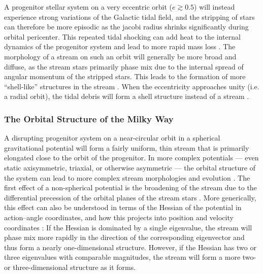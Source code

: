 \documentclass[final,5p,times,twocolumn,authoryear]{elsarticle}
\begin{document}
A progenitor stellar system on a very eccentric orbit ($e \gtrsim 0.5$) will instead
experience strong variations of the Galactic tidal field, and the stripping of stars can
therefore be more episodic as the jacobi radius shrinks significantly during orbital
pericenter.
This repeated tidal shocking can add heat to the internal dynamics of the progenitor
system and lead to more rapid mass loss \citep[e.g.,][]{gnedin:1999}.
The morphology of a stream on such an orbit will generally be more broad and diffuse, as
the stream stars primarily phase mix due to the internal spread of angular momentum of
the stripped stars.
This leads to the formation of more ``shell-like'' structures in the stream
\citep[e.g.,][]{hendel:2015}.
When the eccentricity approaches unity (i.e. a radial orbit), the tidal debris will form
a shell structure instead of a stream \citep[e.g.,][]{hernquist:1987, sanderson:2013}.



\subsubsection{The Orbital Structure of the Milky Way}

A disrupting progenitor system on a near-circular orbit in a spherical gravitational
potential will form a fairly uniform, thin stream that is primarily elongated close to
the orbit of the progenitor.
In more complex potentials --- even static axisymmetric, triaxial, or otherwise
asymmetric --- the orbital structure of the system can lead to more complex stream
morphologies and evolution \citep[e.g.,][]{amorisco:2015b}.
The first effect of a non-spherical potential is the broadening of the stream due to the
differential precession of the orbital planes of the stream stars \citep{erkal:2016b}.
More generically, this effect can also be understood in terms of the Hessian of the
potential in action--angle coordinates, and how this projects into position and velocity
coordinates \citep{sanders:2013a}: If the Hessian is dominated by a single eigenvalue,
the stream will phase mix more rapidly in the direction of the corresponding eigenvector
and thus form a nearly one-dimensional structure.
However, if the Hessian has two or three eigenvalues with comparable magnitudes, the
stream will form a more two- or three-dimensional structure as it forms.
\end{document}
